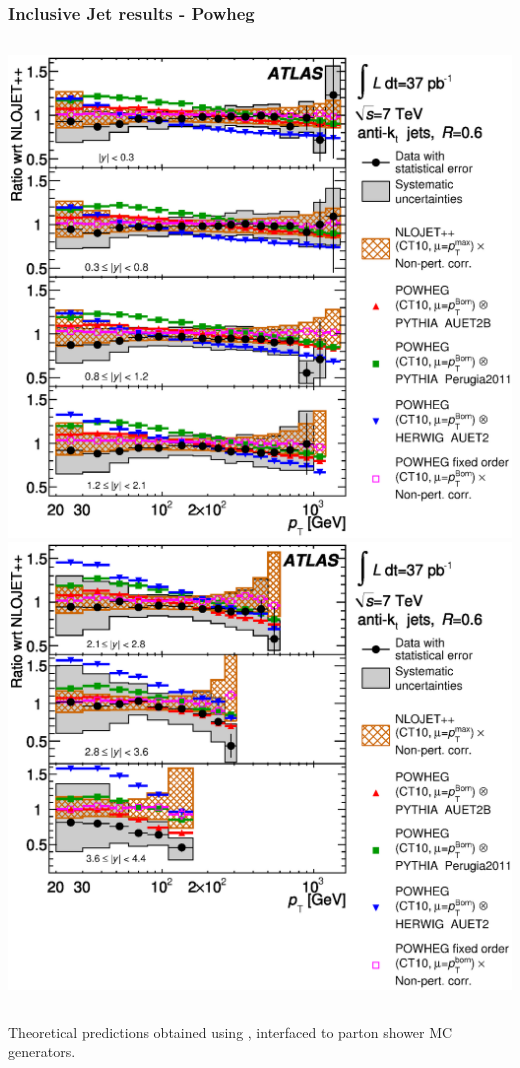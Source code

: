 \documentclass[10pt]{beamer}
\begin{document}
\begin{frame} 
\frametitle{Inclusive Jet results - Powheg}
\begin{columns}
\includegraphics[width=1.0\linewidth,angle=0]{inclusive_results/figs_new/fig_13c_ratio_powheg_akt6a.eps}
\includegraphics[width=1.0\linewidth,angle=0]{inclusive_results/figs_new/fig_13d_ratio_powheg_akt6b.eps}
\end{columns}
Theoretical predictions obtained using \powheg, interfaced to parton shower MC generators.

\end{frame}
\end{document}
